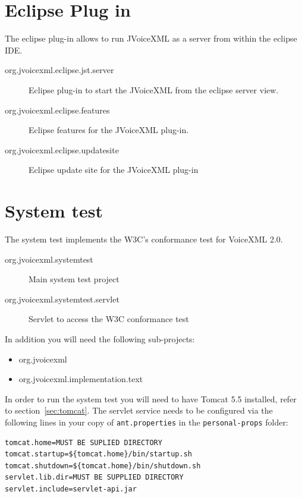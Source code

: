 \documentclass[11pt,a4paper]{article}
\begin{document}
\section{Eclipse Plug in}

The eclipse plug-in allows to run JVoiceXML as a server from within the eclipse
IDE.

\begin{description}
\item[org.jvoicexml.eclipse.jst.server] Eclipse plug-in to start the JVoiceXML
from the eclipse server view.
\item[org.jvoicexml.eclipse.features] Eclipse features for the JVoiceXML
plug-in.
\item[org.jvoicexml.eclipse.updatesite] Eclipse update site for the
JVoiceXML plug-in
\end{description}

\section{System test}

The system test implements the W3C's conformance test for VoiceXML 2.0.

\begin{description}
\item[org.jvoicexml.systemtest] Main system test project
\item[org.jvoicexml.systemtest.servlet] Servlet to access the W3C
confor\-man\-ce test
\end{description}

In addition you will need the following sub-projects:
\begin{itemize}
\item org.jvoicexml
\item org.jvoicexml.implementation.text
\end{itemize} 

In order to run the system test you will need to have Tomcat 5.5 installed,
refer to section~\ref{sec:tomcat}. The
servlet service needs to be configured via the following lines in your copy
of \texttt{ant.properties} in the \texttt{personal-props} folder:

\begin{lstlisting}
tomcat.home=MUST BE SUPLIED DIRECTORY
tomcat.startup=${tomcat.home}/bin/startup.sh
tomcat.shutdown=${tomcat.home}/bin/shutdown.sh
servlet.lib.dir=MUST BE SUPPLIED DIRECTORY
servlet.include=servlet-api.jar
\end{lstlisting}
\end{document}
